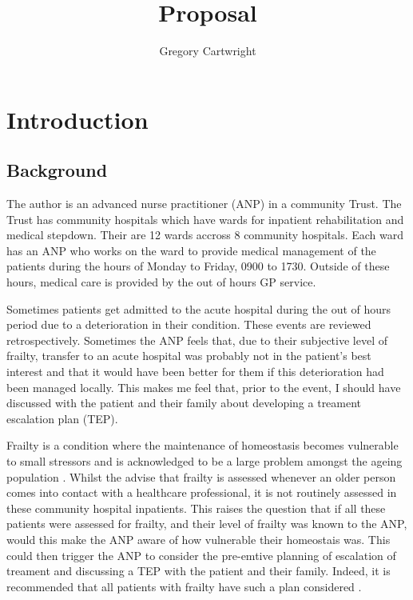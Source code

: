 \documentclass[12pt,a4paper,oneside,titlepage]{article}
\begin{document}
\author{Gregory Cartwright}
\title{Proposal}
\section*{Introduction}

\subsection*{Background}
The author is an advanced nurse practitioner (ANP) in a community Trust.
The Trust has community hospitals which have wards for inpatient rehabilitation and
medical stepdown. Their are 12 wards accross 8 community hospitals. Each ward has
an ANP who works on the ward to provide medical management of the patients during 
the hours of Monday to Friday, 0900 to 1730. Outside of these hours, medical care 
is provided by the out of hours GP service.

Sometimes patients get admitted to the acute hospital during the out of hours period due to a 
deterioration in their condition.
These events are reviewed retrospectively. Sometimes the ANP feels that, 
due to their subjective level of frailty, transfer 
to an acute hospital was probably not in the patient's best interest and that it
would have been better for them if this deterioration had been managed locally.
This makes me feel that, prior to the event, I should have discussed with the patient and
their family about developing a treament escalation plan (TEP).

Frailty is a condition where the maintenance of homeostasis becomes vulnerable to 
small stressors and is acknowledged to be a large problem amongst the ageing population 
\parencite{clegg:13}.
Whilst the \textcite{bgs:14} advise that frailty is assessed whenever an older person
comes into contact with a healthcare professional, it is not routinely assessed 
in these community hospital inpatients. This raises the question that if all these 
patients were assessed for frailty, and their level of frailty was known to the ANP,
would this make the ANP aware of how vulnerable their homeostais was.
This could then trigger the ANP to consider the pre-emtive planning of escalation
of treament and discussing a TEP with the patient and their family. Indeed,
it is recommended that all patients with frailty have such a plan considered
\parencite{bgs:14}.
\end{document}
